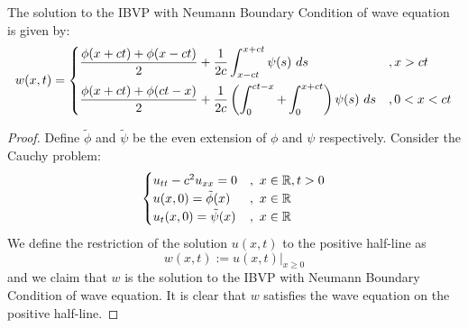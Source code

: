 \begin{lem}
    The solution to the IBVP with Neumann Boundary Condition of wave equation is given by:
    \[w(x,t) = \begin{dcases}
        \frac{\phi(x+ct) + \phi(x-ct)}{2} + \frac{1}{2c} \int_{x-ct}^{x+ct} \psi(s)\ ds &, x > ct\\
        \frac{\phi(x+ct) + \phi(ct-x)}{2} + \frac{1}{2c} \left(\int_{0}^{ct-x} + \int_0^{x+ct}\right) \psi(s)\ ds &, 0 < x < ct
    \end{dcases}\]
\end{lem}
\begin{proof}
    Define $\tilde\phi$ and $\tilde\psi$ be the even extension of $\phi$ and $\psi$ respectively. Consider the Cauchy problem:
    \[\begin{cases}
        u_{tt}-c^2u_{xx} = 0 &,\ x\in {\mathbb R}, t>0 \\
        u(x,0) = \tilde\phi(x) &,\ x\in {\mathbb R} \\
        u_t(x,0) = \tilde\psi(x) &,\ x\in {\mathbb R}
    \end{cases}\]
    We define the restriction of the solution $u(x,t)$ to the positive half-line as
    \[w(x,t):= u(x,t)\vert_{x\geq 0}\]
    and we claim that $w$ is the solution to the IBVP with Neumann Boundary Condition of wave equation. It is clear that $w$ satisfies the wave equation on the positive half-line.


\end{proof}
